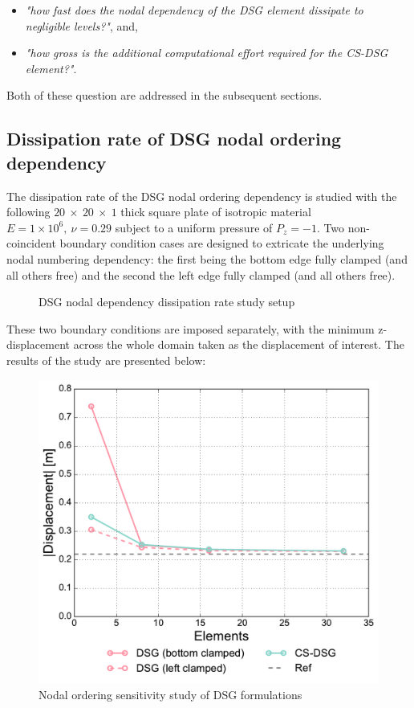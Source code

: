 \begin{itemize}
	\item \textit{"how fast does the nodal dependency of the DSG element dissipate to negligible levels?"}, and,
	\item \textit{"how gross is the additional computational effort required for the CS-DSG element?"}.
\end{itemize}

Both of these question are addressed in the subsequent sections.

\subsection{Dissipation rate of DSG nodal ordering dependency}
The dissipation rate of the DSG nodal ordering dependency is studied with the following $20\ \times\ 20\ \times\ 1$ thick square plate of isotropic material $E = 1\times10^6,\ \nu = 0.29$ subject to a uniform pressure of $P_z = -1$. Two non-coincident boundary condition cases are designed to extricate the underlying nodal numbering dependency: the first being the bottom edge fully clamped (and all others free) and the second the left edge fully clamped (and all others free). 

\begin{figure}[H]
	\caption{\label{csdsg_nodal_dissipation}DSG nodal dependency dissipation rate study setup}
\end{figure}

These two boundary conditions are imposed separately, with the minimum z-displacement across the whole domain taken as the displacement of interest. The results of the study are presented below:

\begin{figure}[H]
	\centering
	\includegraphics[width=12cm]{images/node_ordering_study.pdf}
	\caption{Nodal ordering sensitivity study of DSG formulations}
	\label{fig:Nodal ordering sensitivity study}
\end{figure}

